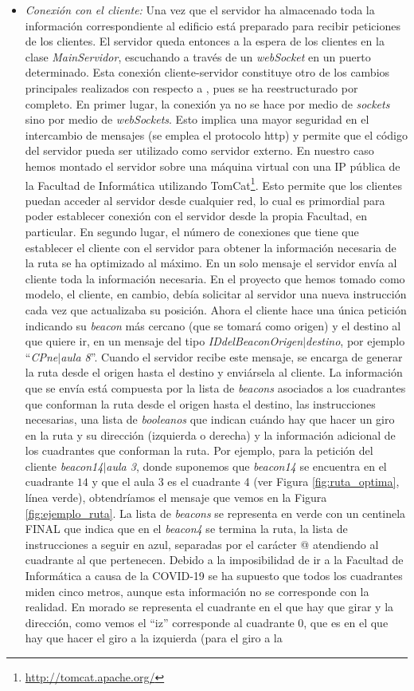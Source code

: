 \begin{itemize}
	\item \textit{Conexión con el cliente:} Una vez que el servidor ha almacenado toda la información correspondiente al edificio está preparado para recibir peticiones de los clientes. El servidor queda entonces a la espera de los clientes en la clase \textit{MainServidor}, escuchando a través de un \textit{webSocket} en un puerto determinado. Esta conexión cliente-servidor constituye otro de los cambios principales realizados con respecto a \cite{TFGguia}, pues se ha reestructurado por completo. En primer lugar, la conexión ya no se hace por medio de \textit{sockets} sino por medio de \textit{webSockets}. Esto implica una mayor seguridad en el intercambio de mensajes (se emplea el protocolo http) y permite que el código del servidor pueda ser utilizado como servidor externo. En nuestro caso hemos montado el servidor sobre una máquina virtual con una IP pública de la Facultad de Informática utilizando TomCat\footnote{\url{http://tomcat.apache.org/}}. Esto permite que los clientes puedan acceder al servidor desde cualquier red, lo cual es primordial para poder establecer conexión con el servidor desde la propia Facultad, en particular. En segundo lugar, el número de conexiones que tiene que establecer el cliente con el servidor para obtener la información necesaria de la ruta se ha optimizado al máximo. En un solo mensaje el servidor envía al cliente toda la información necesaria. En el proyecto que hemos tomado como modelo, el cliente, en cambio, debía solicitar al servidor una nueva instrucción cada vez que actualizaba su posición. Ahora el cliente hace una única petición indicando su \textit{beacon} más cercano (que se tomará como origen) y el destino al que quiere ir, en un mensaje del tipo \textit{IDdelBeaconOrigen$|$destino}, por ejemplo ``\textit{CPne$|$aula 8}''. Cuando el servidor recibe este mensaje, se encarga de generar la ruta desde el origen hasta el destino y enviársela al cliente. La información que se envía está compuesta por la lista de \textit{beacons} asociados a los cuadrantes que conforman la ruta desde el origen hasta el destino, las instrucciones necesarias, una lista de \textit{booleanos} que indican cuándo hay que hacer un giro en la ruta y su dirección (izquierda o derecha) y la información adicional de los cuadrantes que conforman la ruta. Por ejemplo, para la petición del cliente \textit{beacon14$|$aula 3}, donde suponemos que \textit{beacon14} se encuentra en el cuadrante $14$ y que el aula 3 es el cuadrante 4 (ver Figura \ref{fig:ruta_optima}, línea verde), obtendríamos el mensaje que vemos en la Figura \ref{fig:ejemplo_ruta}. La lista de \textit{beacons} se representa en verde con un centinela FINAL que indica que en el \textit{beacon4} se termina la ruta, la lista de instrucciones a seguir en azul, separadas por el carácter @ atendiendo al cuadrante al que pertenecen. Debido a la imposibilidad de ir a la Facultad de Informática a causa de la COVID-19 se ha supuesto que todos los cuadrantes miden cinco metros, aunque esta información no se corresponde con la realidad. En morado se representa el cuadrante en el que hay que girar y la dirección, como vemos el ``iz'' corresponde al cuadrante $0$, que es en el que hay que hacer el giro a la izquierda (para el giro a la 
\end{itemize}

